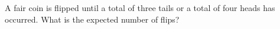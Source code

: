 A fair coin is flipped until a total of three tails or a total of four heads has occurred. What is the expected number of flips?
